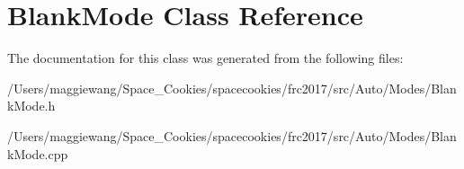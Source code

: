 \hypertarget{class_blank_mode}{}\section{Blank\+Mode Class Reference}
\label{class_blank_mode}


The documentation for this class was generated from the following files\+:\begin{DoxyCompactItemize}
\item 
/\+Users/maggiewang/\+Space\+\_\+\+Cookies/spacecookies/frc2017/src/\+Auto/\+Modes/Blank\+Mode.\+h\item 
/\+Users/maggiewang/\+Space\+\_\+\+Cookies/spacecookies/frc2017/src/\+Auto/\+Modes/Blank\+Mode.\+cpp\end{DoxyCompactItemize}
